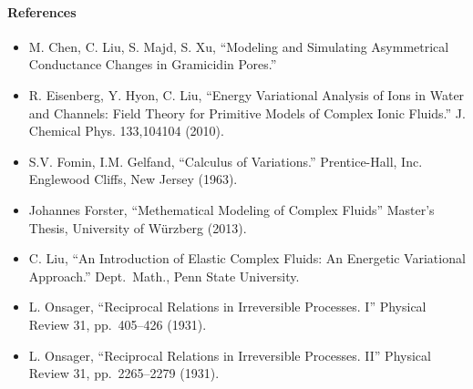 \documentclass[final,10pt]{article}
\begin{document}
\paragraph{References}
\begin{itemize}
	\item M. Chen, C. Liu, S. Majd, S. Xu, ``Modeling and Simulating Asymmetrical Conductance Changes in Gramicidin Pores.'' 
	\item R. Eisenberg, Y. Hyon, C. Liu, ``Energy Variational Analysis of Ions in Water and Channels: Field Theory for Primitive Models of Complex Ionic Fluids.''
			J. Chemical Phys. 133,104104 (2010).
	\item S.V. Fomin, I.M. Gelfand, ``Calculus of Variations.'' Prentice-Hall, Inc.  Englewood Cliffs, New Jersey (1963).
	\item Johannes Forster, ``Methematical Modeling of Complex Fluids'' Master's Thesis, University of W\"urzberg (2013).
	\item C. Liu, ``An Introduction of Elastic Complex Fluids: An Energetic Variational Approach.''  Dept.~Math., Penn State University.
	\item L. Onsager, ``Reciprocal Relations in Irreversible Processes. I'' Physical Review 31, pp.~405--426 (1931).
	\item L. Onsager, ``Reciprocal Relations in Irreversible Processes. II'' Physical Review 31, pp.~2265--2279 (1931).
\end{itemize}
\end{document}
